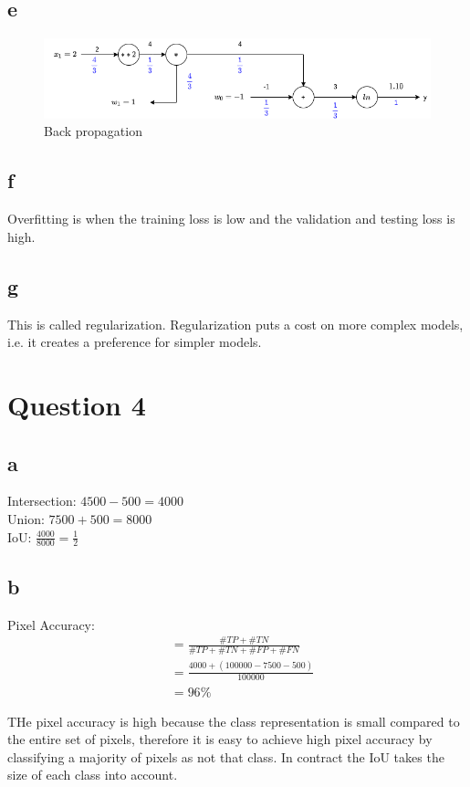 \documentclass[12pt]{article}
\begin{document}
\subsection{e}
\begin{figure}[H]
    \centering
    \includegraphics[width=0.6\linewidth]{3e.png}
    \caption{Back propagation}
\end{figure}

\subsection{f}
Overfitting is when the training loss is low and the validation and testing loss is high.

\subsection{g}
This is called regularization. Regularization puts a cost on more complex models, i.e. it creates a preference for simpler models.

\section{Question 4}
\subsection{a}
Intersection: $4500-500=4000$\\
Union: $7500+500=8000$\\
IoU: $\frac{4000}{8000}=\frac{1}{2}$

\subsection{b}
Pixel Accuracy:
\begin{align*}
     & = \frac{\#TP + \#TN}{\#TP + \#TN + \#FP + \#FN} \\
     & = \frac{4000+(100000-7500-500)}{100000}         \\
     & = 96\%
\end{align*}

THe pixel accuracy is high because the class representation is small compared to the entire set of pixels, therefore it is easy to achieve high pixel accuracy by classifying a majority of pixels as not that class.
In contract the IoU takes the size of each class into account.
\end{document}

